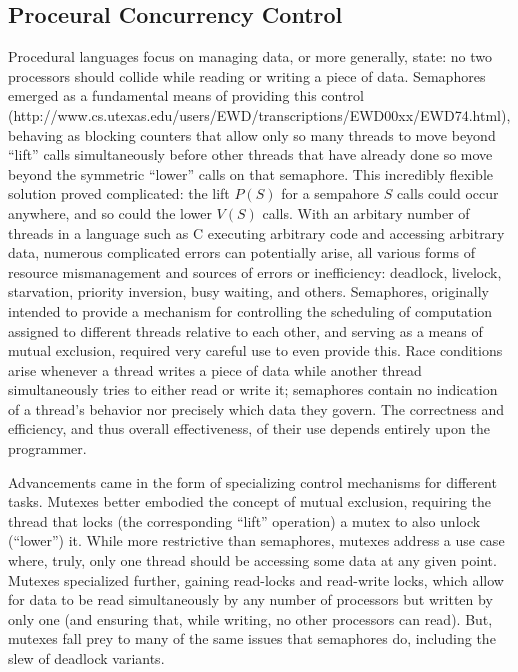 \subsection{Proceural Concurrency Control}
Procedural languages focus on managing data, or more generally,
state: no two processors should collide while reading or writing a piece of
data. Semaphores emerged as a fundamental means of providing this control
(http://www.cs.utexas.edu/users/EWD/transcriptions/EWD00xx/EWD74.html), behaving
as blocking counters that allow only so many threads to move beyond ``lift'' calls
simultaneously before other threads that have already done so move beyond the
symmetric ``lower'' calls on that semaphore. This incredibly flexible solution
proved complicated: the lift $P(S)$ for a sempahore $S$ calls could occur
anywhere, and so could the lower $V(S)$ calls. With an arbitary number of
threads in a language such as C executing arbitrary code and accessing arbitrary
data, numerous complicated errors can potentially arise, all various forms of
resource mismanagement and sources of errors or inefficiency: deadlock,
livelock, starvation, priority inversion, busy waiting, and others. Semaphores,
originally intended to provide a mechanism for controlling the scheduling of
computation assigned to different threads relative to each other, and serving as
a means of mutual exclusion, required very careful use to even provide this.
Race conditions arise whenever a thread writes a piece of data while another
thread simultaneously tries to either read or write it; semaphores contain no
indication of a thread's behavior nor precisely which data they govern. The
correctness and efficiency, and thus overall effectiveness, of their use depends
entirely upon the programmer.

Advancements came in the form of specializing control mechanisms for different
tasks. Mutexes better embodied the concept of mutual exclusion, requiring the
thread that locks (the corresponding ``lift'' operation) a mutex to also unlock
(``lower'') it. While more restrictive than semaphores, mutexes address a use
case where, truly, only one thread should be accessing some data at any given
point. Mutexes specialized further, gaining read-locks and read-write locks,
which allow for data to be read simultaneously by any number of processors but
written by only one (and ensuring that, while writing, no other processors can
read). But, mutexes fall prey to many of the same issues that semaphores do,
including the slew of deadlock variants.

